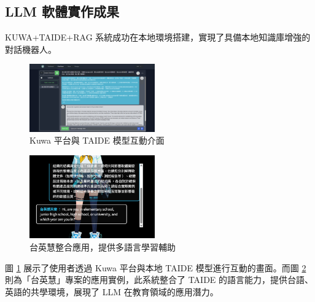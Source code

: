 \documentclass[twocolumn,11pt,a4paper]{article}
\begin{document}
\subsection{LLM 軟體實作成果}
KUWA+TAIDE+RAG 系統成功在本地環境搭建，實現了具備本地知識庫增強的對話機器人。
\begin{figure}[htbp]
    \centering
    \includegraphics[width=0.48\textwidth]{res/image/taide_chat.png}
    \caption{Kuwa 平台與 TAIDE 模型互動介面}
    \label{fig:taide_chat}
\end{figure}
\begin{figure}[htbp]
    \centering
    \includegraphics[width=0.48\textwidth]{res/image/台英慧.png}
    \caption{台英慧整合應用，提供多語言學習輔助}
    \label{fig:taiinhei}
\end{figure}
圖 \ref{fig:taide_chat} 展示了使用者透過 Kuwa 平台與本地 TAIDE 模型進行互動的畫面。而圖 \ref{fig:taiinhei} 則為「台英慧」專案的應用實例，此系統整合了 TAIDE 的語言能力，提供台語、英語的共學環境，展現了 LLM 在教育領域的應用潛力。
\end{document}
